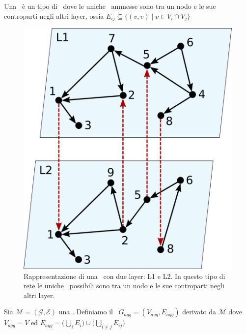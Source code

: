 \begin{definizione} 
    \label{def:mulx}
    Una \mulx\ è un tipo di \muln\ dove le uniche \interc\ ammesse sono tra un 
    nodo e le sue controparti negli altri layer, ossia 
    $E_{ij} \subseteq \{ (v,v) \mid v \in {V_i \cap V_j} \} $
\end{definizione}

\begin{figure}
    \centering
    \includegraphics[height=0.3\textheight]{img/muxexample1.pdf}
    \caption{Rappresentazione di una \mulx\ con due layer: L1 e L2. In questo 
    tipo di rete le uniche \interc\ possibili sono tra un nodo e le sue controparti 
    negli altri layer.}
    \label{fig:muxexample}
\end{figure}

\begin{definizione} 
    \label{def:gragg}
    Sia $\mathcal{M} = (\mathcal{G}, \mathcal{E} )$ una \muln. 
    Definiamo il \gragg\ $G_{agg} = (V_{agg}, E_{agg})$ derivato
    da $\mathcal{M}$ dove $V_{agg} = V$ ed 
    $E_{agg} = \biggl( \bigcup\limits_{i} E_{i} \biggr) \cup 
                    \biggl( \bigcup\limits_{i \neq j} E_{ij} \biggr)$
\end{definizione}

